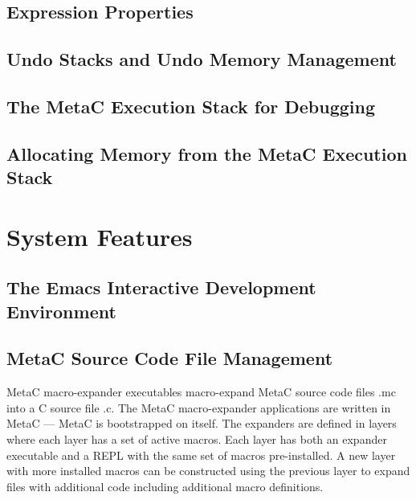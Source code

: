 \documentclass{article}
\begin{document}
\subsection{Expression Properties}

\subsection{Undo Stacks and Undo Memory Management}

\subsection{The MetaC Execution Stack for Debugging}

\subsection{Allocating Memory from the MetaC Execution Stack}

\section{System Features}

\subsection{The Emacs Interactive Development Environment}

\subsection{MetaC Source Code File Management}

MetaC macro-expander executables macro-expand MetaC source code files .mc into a C source file .c.  The MetaC macro-expander applications
are written in MetaC --- MetaC is bootstrapped on itself.  The expanders are defined in layers where each layer has a set of active macros.
Each layer has both an expander executable and a REPL with the same set of macros pre-installed.  A new layer with more installed macros
can be constructed using the previous layer to expand files with additional code including additional macro definitions.
\end{document}
